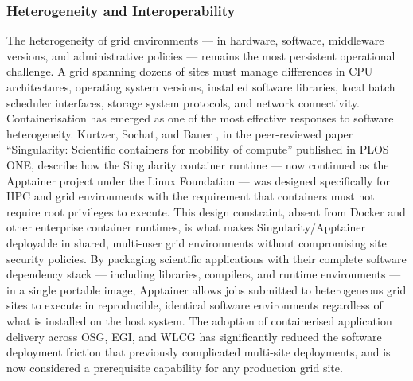 \documentclass[12pt,a4paper]{report}
\begin{document}
\subsubsection*{Heterogeneity and Interoperability}
The heterogeneity of grid environments
— in hardware, software, middleware versions, and administrative policies — remains the most persistent operational challenge. 
A grid spanning dozens of sites must manage differences in CPU architectures, operating system versions, 
installed software libraries, local batch scheduler interfaces, storage system protocols, and network connectivity. 
Containerisation has emerged as one of the most effective responses to software heterogeneity. Kurtzer, Sochat, and Bauer \parencite{kurtzer2017}, 
in the peer-reviewed paper “Singularity: Scientific containers for mobility of compute” published in PLOS ONE, describe how the 
Singularity container runtime — now continued as the Apptainer project under the Linux Foundation — was designed specifically for
 HPC and grid environments with the requirement that containers must not require root privileges to execute. This design constraint, 
 absent from Docker and other enterprise container runtimes, is what makes Singularity/Apptainer deployable in shared, multi-user grid
  environments without compromising site security policies. By packaging scientific applications with their complete software dependency
   stack — including libraries, compilers, and runtime environments — in a single portable image, Apptainer allows jobs submitted to 
   heterogeneous grid sites to execute in reproducible, identical software environments regardless of what is installed on the host system.
    The adoption of containerised application delivery across OSG, EGI, and WLCG has significantly reduced the software deployment friction 
    that previously complicated multi-site deployments, and is now considered a prerequisite capability for any production grid site.
\end{document}
